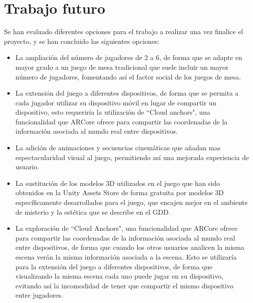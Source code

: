 \section{Trabajo futuro}
Se han evaluado diferentes opciones para el trabajo a realizar una vez finalice el proyecto, y se han concluido las siguientes opciones:

\begin{itemize}
  \item La ampliación del número de jugadores de 2 a 6, de forma que se adapte en mayor grado a un juego de mesa tradicional que suele incluir un mayor número de jugadores, fomentando así el factor social de los juegos de mesa.

  \item La extensión del juego a diferentes dispositivos, de forma que se permita a cada jugador utilizar su dispositivo móvil en lugar de compartir un dispositivo, esto requeriría la utilización de ``Cloud anchors", una funcionalidad que ARCore ofrece para compartir las coordenadas de la información asociada al mundo real entre dispositivos.

  \item La adición de animaciones y secuencias cinemáticas que añadan mas espectacularidad visual al juego, permitiendo así una mejorada experiencia de usuario.

  \item La sustitución de los modelos 3D utilizados en el juego que han sido obtenidos en la Unity Assets Store de forma gratuita por modelos 3D específicamente desarrollados para el juego, que encajen mejor en el ambiente de misterio y la estética que se describe en el GDD.

  \item La exploración de ``Cloud Anchors", una funcionalidad que ARCore ofrece para compartir las coordenadas de la información asociada al mundo real entre dispositivos, de forma que cuando los otros usuarios analicen la misma escena verán la misma información asociada a la escena. Esto se utilizaría para la extensión del juego a diferentes dispositivos, de forma que visualizando la misma escena cada uno puede jugar en su dispositivo, evitando así la incomodidad de tener que compartir el mismo dispositivo entre jugadores.

\end{itemize}
